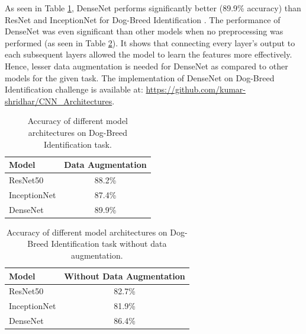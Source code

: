 \documentclass[11pt,twocolumn,letterpaper]{article}
\begin{document}
As seen in Table \ref{table: table1}, DenseNet performs significantly better (89.9\% accuracy) than ResNet and InceptionNet for Dog-Breed Identification \cite{KhoslaYaoJayadevaprakashFeiFei_FGVC2011}. The performance of DenseNet was even significant than other models when no preprocessing was performed (as seen in Table \ref{table: table2}). It shows that connecting every layer's output to each subsequent layers allowed the model to learn the features more effectively. Hence, lesser data augmentation is needed for DenseNet as compared to other models for the given task. The implementation of DenseNet on Dog-Breed Identification challenge is available at: \url{https://github.com/kumar-shridhar/CNN_Architectures}.


\begin{table}
	\begin{center}
		\begin{tabular}{|l|c|}
			\hline
			Model         & Data Augmentation  \\
			\hline\hline
			ResNet50        & 88.2\% \\
			InceptionNet  & 87.4\% \\
			DenseNet      & 89.9\% \\
			\hline
		\end{tabular}
	\end{center}
	\caption{Accuracy of different model architectures on Dog-Breed Identification task.}
	\label{table: table1}
\end{table}

\begin{table}
	\begin{center}
		\begin{tabular}{|l|c|}
			\hline
			Model         & Without Data Augmentation  \\
			\hline\hline
			ResNet50      & 82.7\% \\
			InceptionNet  & 81.9\% \\
			DenseNet      & 86.4\% \\
			\hline
		\end{tabular}
	\end{center}
	\caption{Accuracy of different model architectures on Dog-Breed Identification task without data augmentation.}
	\label{table: table2}
\end{table}
\end{document}
